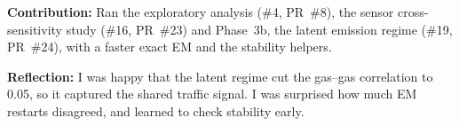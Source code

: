 \textbf{Contribution:} Ran the exploratory analysis (\#4, PR~\#8), the sensor
cross-sensitivity study (\#16, PR~\#23) and Phase~3b, the latent emission
regime (\#19, PR~\#24), with a faster exact EM and the stability helpers.

\noindent\textbf{Reflection:} I was happy that the latent regime cut the
gas--gas correlation to 0.05, so it captured the shared traffic signal. I was
surprised how much EM restarts disagreed, and learned to check stability early.
